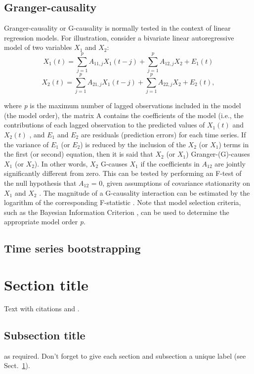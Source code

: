 \subsection{Granger-causality}
    Granger-causality or G-causality is normally tested in the context of linear regression models. For illustration, consider a bivariate linear autoregressive model of two variables $X_1$ and $X_2$:
    \begin{equation}
        X_1(t)= \sum^{p}_{j=1}A_{11,j}X_{1}(t-j) + \sum^{p}_{j=1}A_{12,j}X_{2}+E_1(t)
    \end{equation} 
    \begin{equation}
        X_2(t)= \sum^{p}_{j=1}A_{21,j}X_{1}(t-j) + \sum^{p}_{j=1}A_{22,j}X_{2}+E_2(t),
    \end{equation}
    
    where \textit{p} is the maximum number of lagged observations included in the model (the model order), the matrix A contains the coefficients of the model (i.e., the contributions of each lagged observation to the predicted values of $X_1(t)$ and $X_2(t)$ , and $E_1$ and $E_2$ are residuals (prediction errors) for each time series. If the variance of $E_1$ (or $E_2$) is reduced by the inclusion of the $X_2$ (or $X_1$) terms in the first (or second) equation, then it is said that $X_2$ (or $X_1$) Granger-(G)-causes $X_1$ (or $X_2$). In other words, $X_2$ G-causes $X_1$ if the coefficients in $A_{12}$ are jointly significantly different from zero. This can be tested by performing an F-test of the null hypothesis that $A_{12}$ = 0, given assumptions of covariance stationarity on $X_1$ and $X_2$ . The magnitude of a G-causality interaction can be estimated by the logarithm of the corresponding F-statistic \cite{Ref_4}. Note that model selection criteria, such as the Bayesian Information Criterion \cite{Ref_5}, can be used to determine the appropriate model order \textit{p}.

\subsection{Time series bootstrapping}
    

\section{Section title}
\label{sec:1}
Text with citations \cite{RefB} and \cite{RefJ}.
\subsection{Subsection title}
\label{sec:2}
as required. Don't forget to give each section
and subsection a unique label (see Sect.~\ref{sec:1}).
